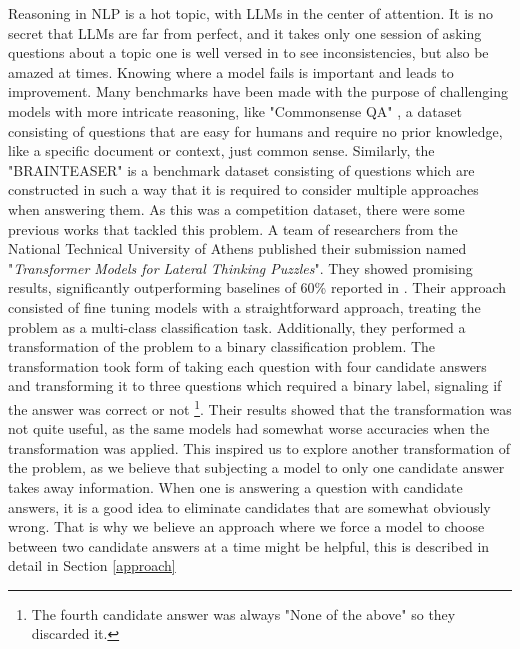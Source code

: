 Reasoning in NLP is a hot topic, with LLMs in the center of attention.
It is no secret that LLMs are far from perfect, and it takes only one session of asking questions about a topic one is well versed in to see inconsistencies, but also be amazed at times.
Knowing where a model fails is important and leads to improvement.  Many benchmarks have been made with the purpose of challenging models with more intricate reasoning, like "Commonsense QA" \citep{commonsenseQA}, a dataset consisting of questions that are easy for humans and require no prior knowledge, like a specific document or context, just common sense.
Similarly, the "BRAINTEASER" \citep{semeval} is a benchmark dataset consisting of questions which are constructed in such a way that it is required to consider multiple approaches when answering them.
As this was a competition dataset, there were some previous works that tackled this problem.
A team of researchers from the National Technical University of Athens published their submission \citep{ails-lab} named "\textit{Transformer Models for Lateral Thinking Puzzles}".
They showed promising results, significantly outperforming baselines of 60\% reported in \citep{semeval}.
Their approach consisted of fine tuning models with a straightforward approach, treating the problem as a multi-class classification task. Additionally, they performed a transformation of the problem to a binary classification problem. 
The transformation took form of taking each question with four candidate answers and transforming it to three questions which required a binary label, signaling if the answer was correct or not \footnote[1]{The fourth candidate answer was always "None of the above" so they discarded it.}.
Their results showed that the transformation was not quite useful, as the same models had somewhat worse accuracies when the transformation was applied.  
This inspired us to explore another transformation of the problem, as we believe that subjecting a model to only one candidate answer takes away information.
When one is answering a question with candidate answers, it is a good idea to eliminate candidates that are somewhat obviously wrong.
That is why we believe an approach where we force a model to choose between two candidate answers at a time might be helpful, this is described in detail in Section \ref{approach}